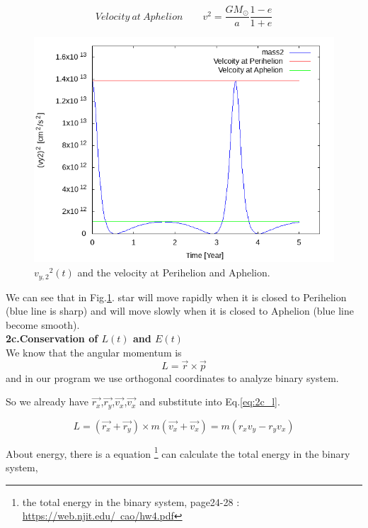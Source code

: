 \documentclass{article}
\begin{document}
\begin{equation}
Velocity\ at\ Aphelion \qquad v^2= \frac{GM_\odot}{a} \frac{1-e}{1+e}
\label{eq:2b_-}
\end{equation}

\begin{figure}[h]
    \centering 
	\includegraphics[scale=0.45]{pro2_b.png}
	\caption{${v_{y,2}}^2(t)$ and the velocity at Perihelion and Aphelion.} %
	\label{fig:pro2_b} %
\end{figure}

We can see that in Fig.\ref{fig:pro2_b}. star will move rapidly when it is closed to Perihelion (blue line is sharp) and will move slowly when it is closed to Aphelion (blue line become smooth).\\

\textbf{2c.Conservation of $L(t)$ and  $E(t)$}\\
We know that the angular momentum is
\begin{equation}
L= \vec{r} \times \vec{p}
\label{eq:2c_l}
\end{equation}
and in our program we use orthogonal coordinates to analyze binary system.

So we already have $\vec{r_x}$,$\vec{r_y}$,$\vec{v_x}$,$\vec{v_x}$ and substitute into Eq.\ref{eq:2c_l}.

$$L=(\vec{r_x}+\vec{r_y}) \times m(\vec{v_x}+\vec{v_x})=m(r_xv_y-r_yv_x)$$

About energy, there is a equation
\footnote{the total energy in the binary system, page24-28 :
\href{https://web.njit.edu/~cao/hw4.pdf}{https://web.njit.edu/~cao/hw4.pdf}}
can calculate the total energy in the binary system,
\end{document}
